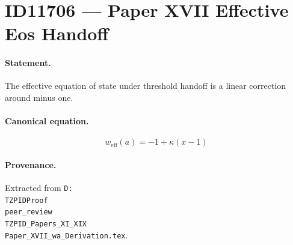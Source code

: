 \section*{ID11706 --- Paper XVII Effective Eos Handoff}

\paragraph{Statement.}
The effective equation of state under threshold handoff is a linear correction around minus one.

\paragraph{Canonical equation.}
\[
w_{\mathrm{eff}}(a)=-1+\kappa(x-1)
\]

\paragraph{Provenance.}
Extracted from \texttt{D:\\TZPIDProof\\peer\_review\\TZPID\_Papers\_XI\_XIX\\Paper\_XVII\_wa\_Derivation.tex}.
